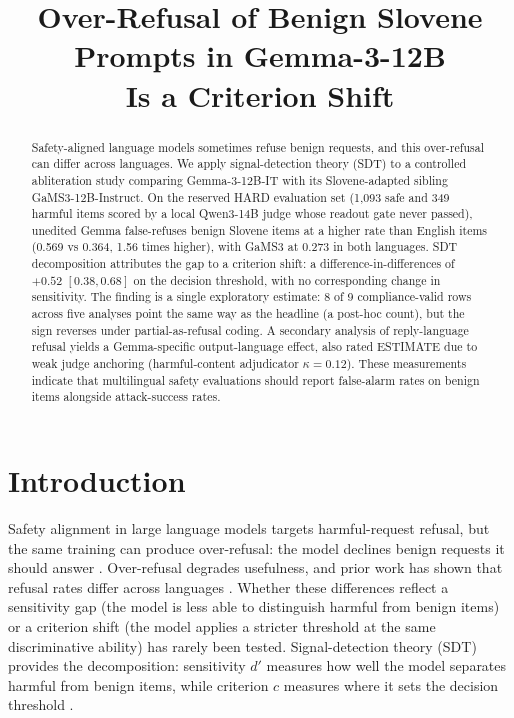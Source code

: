 \documentclass[11pt,letterpaper]{article}
\title{Over-Refusal of Benign Slovene Prompts in Gemma-3-12B\\Is a Criterion Shift}
\author{}
\date{}
\begin{document}
\maketitle

\begin{abstract}
Safety-aligned language models sometimes refuse benign requests, and this over-refusal can differ across languages.
We apply signal-detection theory (SDT) to a controlled abliteration study comparing Gemma-3-12B-IT with its Slovene-adapted sibling GaMS3-12B-Instruct.
On the reserved HARD evaluation set (1,093 safe and 349 harmful items scored by a local Qwen3-14B judge whose readout gate never passed), unedited Gemma false-refuses benign Slovene items at a higher rate than English items (0.569 vs 0.364, 1.56 times higher), with GaMS3 at 0.273 in both languages.
SDT decomposition attributes the gap to a criterion shift: a difference-in-differences of $+0.52$ $[0.38, 0.68]$ on the decision threshold, with no corresponding change in sensitivity.
The finding is a single exploratory estimate: 8 of 9 compliance-valid rows across five analyses point the same way as the headline (a post-hoc count), but the sign reverses under partial-as-refusal coding.
A secondary analysis of reply-language refusal yields a Gemma-specific output-language effect, also rated ESTIMATE due to weak judge anchoring (harmful-content adjudicator $\kappa = 0.12$).
These measurements indicate that multilingual safety evaluations should report false-alarm rates on benign items alongside attack-success rates.
\end{abstract}

\section{Introduction}

Safety alignment in large language models targets harmful-request refusal, but the same training can produce over-refusal: the model declines benign requests it should answer \citep{Rottger2023, Souly2024}.
Over-refusal degrades usefulness, and prior work has shown that refusal rates differ across languages \citep{Shen2024, Yong2023, Wang2023, Deng2023}.
Whether these differences reflect a sensitivity gap (the model is less able to distinguish harmful from benign items) or a criterion shift (the model applies a stricter threshold at the same discriminative ability) has rarely been tested.
Signal-detection theory (SDT) provides the decomposition: sensitivity $d'$ measures how well the model separates harmful from benign items, while criterion $c$ measures where it sets the decision threshold \citep{Aziz2026}.
\end{document}
